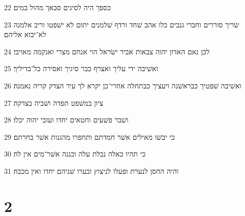 \par 22 כספך היה לסיגים סבאך מהול במים׃
\par 23 שׂריך סוררים וחברי גנבים כלו אהב שׁחד ורדף שׁלמנים יתום לא ישׁפטו וריב אלמנה לא־יבוא אליהם׃
\par 24 לכן נאם האדון יהוה צבאות אביר ישׂראל הוי אנחם מצרי ואנקמה מאויבי׃
\par 25 ואשׁיבה ידי עליך ואצרף כבר סיגיך ואסירה כל־בדיליך׃
\par 26 ואשׁיבה שׁפטיך כבראשׁנה ויעציך כבתחלה אחרי־כן יקרא לך עיר הצדק קריה נאמנה׃
\par 27 ציון במשׁפט תפדה ושׁביה בצדקה׃
\par 28 ושׁבר פשׁעים וחטאים יחדו ועזבי יהוה יכלו׃
\par 29 כי יבשׁו מאילים אשׁר חמדתם ותחפרו מהגנות אשׁר בחרתם׃
\par 30 כי תהיו כאלה נבלת עלה וכגנה אשׁר־מים אין לה׃
\par 31 והיה החסן לנערת ופעלו לניצוץ ובערו שׁניהם יחדו ואין מכבה׃

\chapter{2}


